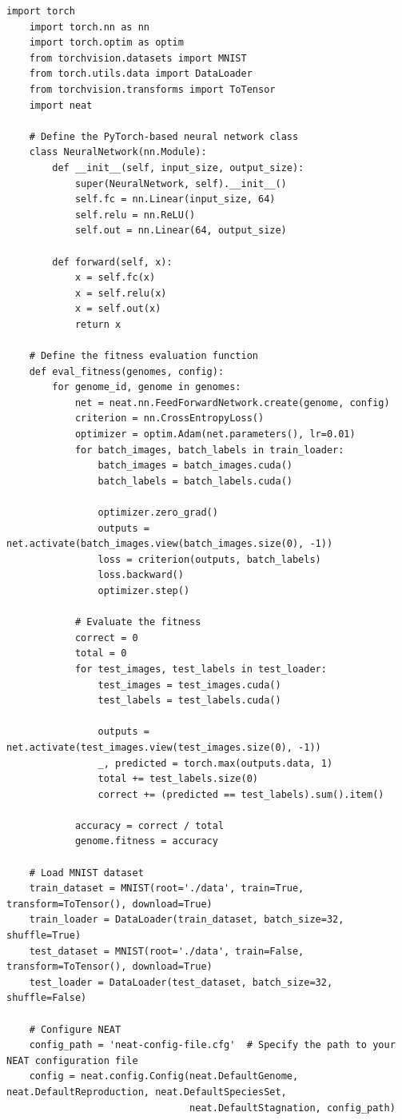 \documentclass{article}
\begin{document}
\begin{lstlisting}[style=pythonstyle, caption={Программный код реализации алгоритма NEAT с применением модуля PyTorch}, label={lst:pythoncode}]
	import torch
	import torch.nn as nn
	import torch.optim as optim
	from torchvision.datasets import MNIST
	from torch.utils.data import DataLoader
	from torchvision.transforms import ToTensor
	import neat
	
	# Define the PyTorch-based neural network class
	class NeuralNetwork(nn.Module):
		def __init__(self, input_size, output_size):
			super(NeuralNetwork, self).__init__()
			self.fc = nn.Linear(input_size, 64)
			self.relu = nn.ReLU()
			self.out = nn.Linear(64, output_size)
	
		def forward(self, x):
			x = self.fc(x)
			x = self.relu(x)
			x = self.out(x)
			return x
	
	# Define the fitness evaluation function
	def eval_fitness(genomes, config):
		for genome_id, genome in genomes:
			net = neat.nn.FeedForwardNetwork.create(genome, config)
			criterion = nn.CrossEntropyLoss()
			optimizer = optim.Adam(net.parameters(), lr=0.01)
			for batch_images, batch_labels in train_loader:
				batch_images = batch_images.cuda()
				batch_labels = batch_labels.cuda()
	
				optimizer.zero_grad()
				outputs = net.activate(batch_images.view(batch_images.size(0), -1))
				loss = criterion(outputs, batch_labels)
				loss.backward()
				optimizer.step()
			
			# Evaluate the fitness
			correct = 0
			total = 0
			for test_images, test_labels in test_loader:
				test_images = test_images.cuda()
				test_labels = test_labels.cuda()
				
				outputs = net.activate(test_images.view(test_images.size(0), -1))
				_, predicted = torch.max(outputs.data, 1)
				total += test_labels.size(0)
				correct += (predicted == test_labels).sum().item()
			
			accuracy = correct / total
			genome.fitness = accuracy
	
	# Load MNIST dataset
	train_dataset = MNIST(root='./data', train=True, transform=ToTensor(), download=True)
	train_loader = DataLoader(train_dataset, batch_size=32, shuffle=True)
	test_dataset = MNIST(root='./data', train=False, transform=ToTensor(), download=True)
	test_loader = DataLoader(test_dataset, batch_size=32, shuffle=False)
	
	# Configure NEAT
	config_path = 'neat-config-file.cfg'  # Specify the path to your NEAT configuration file
	config = neat.config.Config(neat.DefaultGenome, neat.DefaultReproduction, neat.DefaultSpeciesSet,
								neat.DefaultStagnation, config_path)
	

\end{lstlisting}
\end{document}
